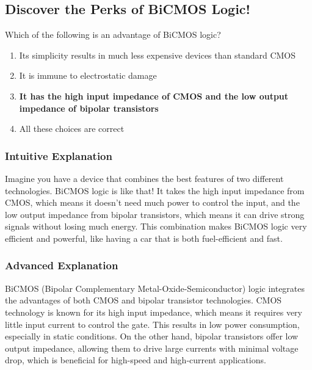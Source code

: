 \subsection{Discover the Perks of BiCMOS Logic!}

\begin{tcolorbox}[colback=gray!10!white,colframe=black!75!black,title=E6C04] Which of the following is an advantage of BiCMOS logic?
    \begin{enumerate}[label=\Alph*,noitemsep]
        \item Its simplicity results in much less expensive devices than standard CMOS
        \item It is immune to electrostatic damage
        \item \textbf{It has the high input impedance of CMOS and the low output impedance of bipolar transistors}
        \item All these choices are correct
    \end{enumerate}
\end{tcolorbox}

\subsubsection{Intuitive Explanation}
Imagine you have a device that combines the best features of two different technologies. BiCMOS logic is like that! It takes the high input impedance from CMOS, which means it doesn't need much power to control the input, and the low output impedance from bipolar transistors, which means it can drive strong signals without losing much energy. This combination makes BiCMOS logic very efficient and powerful, like having a car that is both fuel-efficient and fast.

\subsubsection{Advanced Explanation}
BiCMOS (Bipolar Complementary Metal-Oxide-Semiconductor) logic integrates the advantages of both CMOS and bipolar transistor technologies. CMOS technology is known for its high input impedance, which means it requires very little input current to control the gate. This results in low power consumption, especially in static conditions. On the other hand, bipolar transistors offer low output impedance, allowing them to drive large currents with minimal voltage drop, which is beneficial for high-speed and high-current applications.

